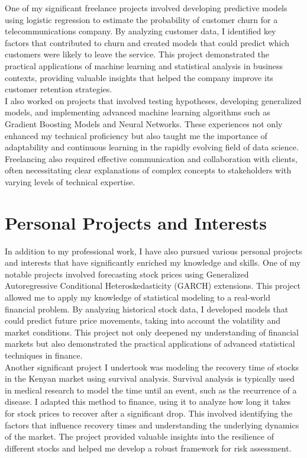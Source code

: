 \documentclass[12pt,a4paper,sans,english]{report}
\begin{document}
\noindent One of my significant freelance projects involved developing predictive models using logistic regression to estimate the probability of customer churn for a telecommunications company. By analyzing customer data, I identified key factors that contributed to churn and created models that could predict which customers were likely to leave the service. This project demonstrated the practical applications of machine learning and statistical analysis in business contexts, providing valuable insights that helped the company improve its customer retention strategies.\\

\noindent I also worked on projects that involved testing hypotheses, developing generalized models, and implementing advanced machine learning algorithms such as Gradient Boosting Models and Neural Networks. These experiences not only enhanced my technical proficiency but also taught me the importance of adaptability and continuous learning in the rapidly evolving field of data science. Freelancing also required effective communication and collaboration with clients, often necessitating clear explanations of complex concepts to stakeholders with varying levels of technical expertise.
\chapter{Personal Projects and Interests}

\noindent In addition to my professional work, I have also pursued various personal projects and interests that have significantly enriched my knowledge and skills. One of my notable projects involved forecasting stock prices using Generalized Autoregressive Conditional Heteroskedasticity (GARCH) extensions. This project allowed me to apply my knowledge of statistical modeling to a real-world financial problem. By analyzing historical stock data, I developed models that could predict future price movements, taking into account the volatility and market conditions. This project not only deepened my understanding of financial markets but also demonstrated the practical applications of advanced statistical techniques in finance.\\

\noindent Another significant project I undertook was modeling the recovery time of stocks in the Kenyan market using survival analysis. Survival analysis is typically used in medical research to model the time until an event, such as the recurrence of a disease. I adapted this method to finance, using it to analyze how long it takes for stock prices to recover after a significant drop. This involved identifying the factors that influence recovery times and understanding the underlying dynamics of the market. The project provided valuable insights into the resilience of different stocks and helped me develop a robust framework for risk assessment.\\
\end{document}
